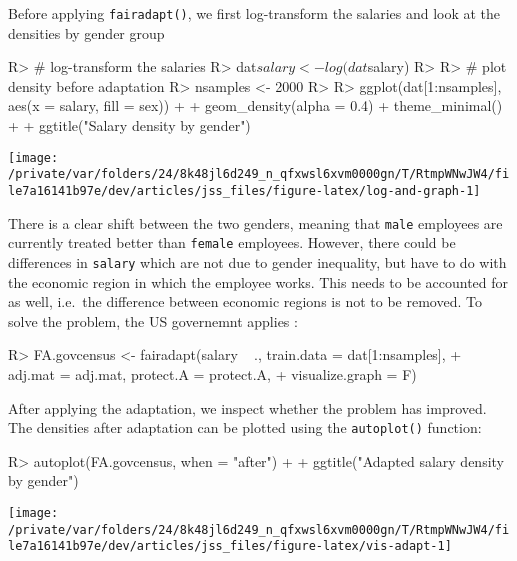 \documentclass[
  notitle]{jss}
\begin{document}
Before applying \texttt{fairadapt()}, we first log-transform the
salaries and look at the densities by gender group

\begin{CodeChunk}
\begin{CodeInput}
R> # log-transform the salaries
R> dat$salary <- log(dat$salary)
R> 
R> # plot density before adaptation
R> nsamples <- 2000
R> 
R> ggplot(dat[1:nsamples], aes(x = salary, fill = sex)) +
+   geom_density(alpha = 0.4)  + theme_minimal() +
+   ggtitle("Salary density by gender")
\end{CodeInput}


\begin{center}\texttt{[image: /private/var/folders/24/8k48jl6d249\_n\_qfxwsl6xvm0000gn/T/RtmpWNwJW4/file7a16141b97e/dev/articles/jss\_files/figure-latex/log-and-graph-1]} \end{center}

\end{CodeChunk}

There is a clear shift between the two genders, meaning that
\texttt{male} employees are currently treated better than
\texttt{female} employees. However, there could be differences in
\texttt{salary} which are not due to gender inequality, but have to do
with the economic region in which the employee works. This needs to be
accounted for as well, i.e.~the difference between economic regions is
not to be removed. To solve the problem, the US governemnt applies
:

\begin{CodeChunk}
\begin{CodeInput}
R> FA.govcensus <- fairadapt(salary ~ ., train.data = dat[1:nsamples],
+                           adj.mat = adj.mat, protect.A = protect.A,
+                           visualize.graph = F)
\end{CodeInput}
\end{CodeChunk}

After applying the adaptation, we inspect whether the problem has
improved. The densities after adaptation can be plotted using the
\texttt{autoplot()} function:

\begin{CodeChunk}
\begin{CodeInput}
R> autoplot(FA.govcensus, when = "after") +
+   ggtitle("Adapted salary density by gender")
\end{CodeInput}


\begin{center}\texttt{[image: /private/var/folders/24/8k48jl6d249\_n\_qfxwsl6xvm0000gn/T/RtmpWNwJW4/file7a16141b97e/dev/articles/jss\_files/figure-latex/vis-adapt-1]} \end{center}

\end{CodeChunk}
\end{document}
